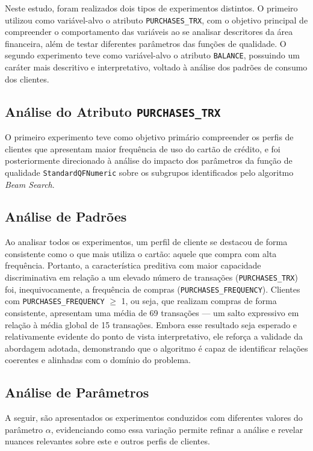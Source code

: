\documentclass[12pt]{article}
\begin{document}
Neste estudo, foram realizados dois tipos de experimentos distintos. O primeiro utilizou como variável-alvo o atributo \texttt{PURCHASES\_TRX}, com o objetivo principal de compreender o comportamento das variáveis ao se analisar descritores da área financeira, além de testar diferentes parâmetros das funções de qualidade. O segundo experimento teve como variável-alvo o atributo \texttt{BALANCE}, possuindo um caráter mais descritivo e interpretativo, voltado à análise dos padrões de consumo dos clientes.

\subsection{Análise do Atributo \texttt{PURCHASES\_TRX}}

O primeiro experimento teve como objetivo primário compreender os perfis de clientes que apresentam maior frequência de uso do cartão de crédito, e foi posteriormente direcionado à análise do impacto dos parâmetros da função de qualidade \texttt{StandardQFNumeric} sobre os subgrupos identificados pelo algoritmo \textit{Beam Search}.

\subsection{Análise de Padrões}

Ao analisar todos os experimentos, um perfil de cliente se destacou de forma consistente como o que mais utiliza o cartão: aquele que compra com alta frequência. Portanto, a característica preditiva com maior capacidade discriminativa em relação a um elevado número de transações (\texttt{PURCHASES\_TRX}) foi, inequivocamente, a frequência de compras (\texttt{PURCHASES\_FREQUENCY}). Clientes com \texttt{PURCHASES\_FREQUENCY} $\geq$ 1, ou seja, que realizam compras de forma consistente, apresentam uma média de 69 transações — um salto expressivo em relação à média global de 15 transações. Embora esse resultado seja esperado e relativamente evidente do ponto de vista interpretativo, ele reforça a validade da abordagem adotada, demonstrando que o algoritmo é capaz de identificar relações coerentes e alinhadas com o domínio do problema.

\subsection{Análise de Parâmetros}

A seguir, são apresentados os experimentos conduzidos com diferentes valores do parâmetro $\alpha$, evidenciando como essa variação permite refinar a análise e revelar nuances relevantes sobre este e outros perfis de clientes.
\end{document}

